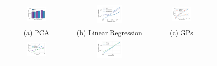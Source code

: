 \documentclass{article}
\begin{document}
\begin{figure}[t!]
    \centering
    \begin{tabular}{ccc}
      \hspace{-2em}
    \includegraphics[width=0.34\textwidth]{./figs/pca.pdf}
      &
      \hspace{-2em}
    \includegraphics[width=0.34\textwidth]{./figs/linear_regression.pdf}
      &
      \hspace{-2em}
    \includegraphics[width=0.34\textwidth]{./figs/gps.pdf}
    \vspace{-1.2em}
    \\
    (a) PCA & (b) Linear Regression & (c) GPs
    \\
      \hspace{-2em}
    \includegraphics[width=0.34\textwidth]{./figs/spectral_clustering.pdf}
      &
      \hspace{-2em}
    \includegraphics[width=0.34\textwidth]{./figs/schrodinger.pdf}

\end{tabular}
\end{figure}
\end{document}
